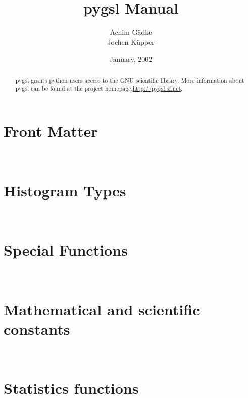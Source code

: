 \documentclass{manual}
\title{pygsl Manual}
\author{Achim G\"adke\footnotemark[1] \\
Jochen K\"upper}
\date{January, 2002}            %
\begin{document}
\maketitle

\ifhtml
\chapter*{Front Matter}
\label{front}
\fi



\begin{abstract}
   \noindent
   pygsl grants python users access to the GNU scientific library.
   More information about pygsl can be found at the project
   homepage,\url{http://pygsl.sf.net}.
\end{abstract}

\tableofcontents


\chapter[\protect\module{pygsl.histogram} --- Histogram Types]
{\protect{} \\ Histogram Types}
\label{cha:histogram-module}


\chapter[\protect\module{pygsl.sf} --- Special Functions]
{\protect{} \\ Special Functions}
\label{cha:sf-module}


\chapter[\protect\module{pygsl.const} --- Mathematical and scientific
constants]{\protect{} \\ Mathematical and scientific
constants} 
 \label{cha:const-module}
 


\chapter[\protect\module{pygsl.statistics} --- Statistics
functions]{\protect{} \\ Statistics functions}
\label{cha:statistics-module}

\end{document}
